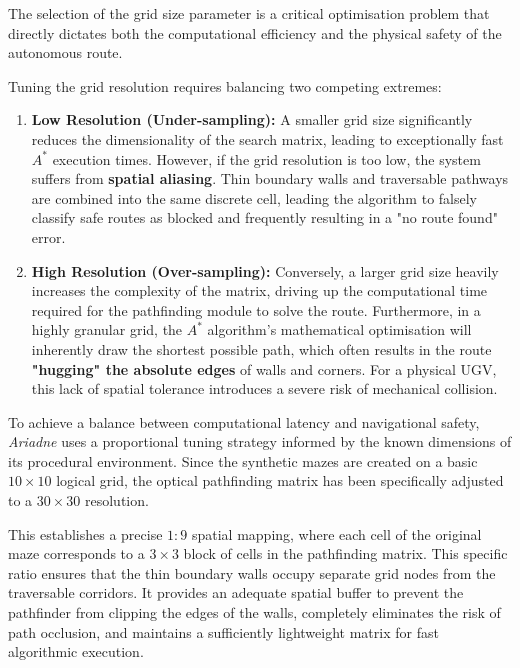 \documentclass[12pt, a4paper]{article}
\begin{document}
\quad The selection of the grid size parameter is a critical optimisation problem that directly dictates both the computational efficiency and the physical safety of the autonomous route.

\vspace{0.5cm}

\hspace{-1.5em}Tuning the grid resolution requires balancing two competing extremes:

\begin{enumerate}
  \item \textbf{Low Resolution (Under-sampling):} A smaller grid size significantly reduces the dimensionality of the search matrix, leading to exceptionally fast $A^*$ execution times. However, if the grid resolution is too low, the system suffers from \textbf{spatial aliasing}. Thin boundary walls and traversable pathways are combined into the same discrete cell, leading the algorithm to falsely classify safe routes as blocked and frequently resulting in a "no route found" error.
  
  \item \textbf{High Resolution (Over-sampling):} Conversely, a larger grid size heavily increases the complexity of the matrix, driving up the computational time required for the pathfinding module to solve the route. Furthermore, in a highly granular grid, the $A^*$ algorithm's mathematical optimisation will inherently draw the shortest possible path, which often results in the route \textbf{"hugging" the absolute edges} of walls and corners. For a physical UGV, this lack of spatial tolerance introduces a severe risk of mechanical collision.
\end{enumerate}

\vspace{0.5cm}

\hspace{-1.5em}To achieve a balance between computational latency and navigational safety, \textit{Ariadne} uses a proportional tuning strategy informed by the known dimensions of its procedural environment. Since the synthetic mazes are created on a basic $10\times10$ logical grid, the optical pathfinding matrix has been specifically adjusted to a $30\times30$ resolution.

\vspace{0.5cm}

This establishes a precise $1:9$ spatial mapping, where each cell of the original maze corresponds to a $3\times3$ block of cells in the pathfinding matrix. This specific ratio ensures that the thin boundary walls occupy separate grid nodes from the traversable corridors. It provides an adequate spatial buffer to prevent the pathfinder from clipping the edges of the walls, completely eliminates the risk of path occlusion, and maintains a sufficiently lightweight matrix for fast algorithmic execution.
\end{document}
